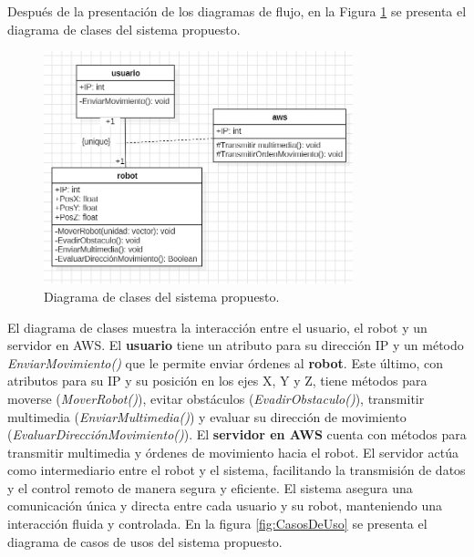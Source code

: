         \vskip 0.5cm
        \clearpage
        Despu\'es de la presentaci\'on de los diagramas de flujo, en la Figura \ref{fig:Clases} se presenta el diagrama de clases del sistema propuesto.
        \vskip 0.5cm
            \begin{figure}[htbp]
                \centering
                \includegraphics[width=0.8\textwidth]{images/desarrollo/diagramas/Clases.jpeg}
                \caption{Diagrama de clases del sistema propuesto.}
                \label{fig:Clases}
            \end{figure}
        \vskip 0.5cm
        El diagrama de clases muestra la interacci\'on entre el usuario, el robot y un servidor en AWS. 
        El \textbf{usuario} tiene un atributo para su direcci\'on IP y un m\'etodo \textit{EnviarMovimiento()} 
        que le permite enviar \'ordenes al \textbf{robot}. Este \'ultimo, con atributos para su IP y su posici\'on en los ejes X, Y 
        y Z, tiene m\'etodos para moverse (\textit{MoverRobot()}), evitar obst\'aculos (\textit{EvadirObstaculo()}), 
        transmitir multimedia (\textit{EnviarMultimedia()}) y evaluar su direcci\'on de movimiento (\textit{EvaluarDirecci\'onMovimiento()}).
        \vskip 0.5cm
        El \textbf{servidor en AWS} cuenta con m\'etodos para transmitir multimedia y \'ordenes de movimiento hacia el robot. 
        El servidor act\'ua como intermediario entre el robot y el sistema, facilitando la transmisi\'on de datos y el control 
        remoto de manera segura y eficiente. El sistema asegura una comunicaci\'on \'unica y directa entre cada usuario y su robot, 
        manteniendo una interacci\'on fluida y controlada.
        \vskip 0.5cm
        En la figura \ref{fig:CasosDeUso} se presenta el diagrama de casos de usos del sistema propuesto.
